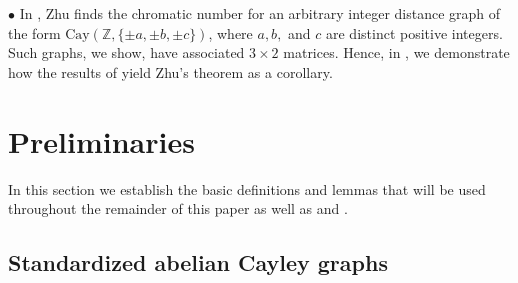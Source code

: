 \documentclass{article}
\theoremstyle{definition}
\theoremstyle{remark}
\begin{document}
$\bullet$ In \cite{Zhu}, Zhu finds the chromatic number for an arbitrary integer distance graph of the form $\text{Cay}(\mathbb{Z},\{\pm a,\pm b,\pm c\})$, where $a, b,$ and $c$ are distinct positive integers.  Such graphs, we show, have associated $3\times 2$ matrices.  Hence, in \cite{Cervantes-Krebs-Zhu}, we demonstrate how the results of \cite{Cervantes-Krebs-small-cases} yield Zhu's theorem as a corollary.

\section{Preliminaries}\label{section-preliminaries}

In this section we establish the basic definitions and lemmas that will be used throughout the remainder of this paper as well as \cite{Cervantes-Krebs-small-cases} and \cite{Cervantes-Krebs-Zhu}.


\subsection{Standardized abelian Cayley graphs}\label{subsection-Standardized-abelian-Cayley-graphs}
\end{document}
